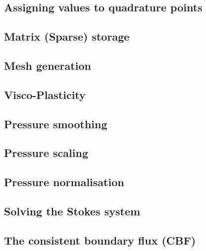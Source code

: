 \documentclass[a4paper]{article}
\begin{document}
\subsection{Assigning values to quadrature points}  %
\newpage %
\subsection{Matrix (Sparse) storage}  %
\newpage %
\subsection{Mesh generation} \label{subsection_meshes}  %
\newpage %
\subsection{Visco-Plasticity}  %
\newpage %
\subsection{Pressure smoothing}  %
\newpage %
\subsection{Pressure scaling}  %
\newpage %
\subsection{Pressure normalisation}  %
\newpage %
\subsection{Solving the Stokes system \label{sec_solvers}}  %
\newpage %
\subsection{The consistent boundary flux (CBF)}  %
\newpage %
\end{document}
